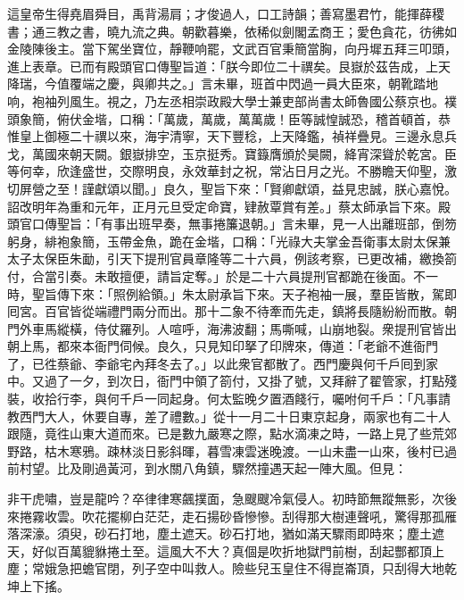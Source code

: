 這皇帝生得堯眉舜目，禹背湯肩；才俊過人，口工詩韻；善寫墨君竹，能揮薛稷書；通三教之書，曉九流之典。朝歡暮樂，依稀似劍閣孟商王；愛色貪花，彷彿如金陵陳後主。{}當下駕坐寶位，靜鞭响罷，文武百官秉簡當胸，向丹墀五拜三叩頭，進上表章。已而有殿頭官口傳聖旨道：「朕今即位二十禩矣。艮嶽於茲告成，上天降瑞，今值覆端之慶，與卿共之。」言未畢，班首中閃過一員大臣來，朝靴踏地响，袍袖列風生。視之，乃左丞相崇政殿大學士兼吏部尚書太師魯國公蔡京也。襆頭象簡，俯伏金堦，口稱：「萬歲，萬歲，萬萬歲！臣等誠惶誠恐，稽首頓首，恭惟皇上御極二十禩以來，海宇清寧，天下豐稔，上天降鑑，禎祥疊見。三邊永息兵戈，萬國來朝天闕。銀嶽排空，玉京挺秀。寶籙膺頒於昊闕，絳宵深聳於乾宮。{}臣等何幸，欣逢盛世，交際明良，永效華封之祝，常沾日月之光。不勝瞻天仰聖，激切屏營之至！謹獻頌以聞。」{}良久，聖旨下來：「賢卿獻頌，益見忠誠，朕心嘉悅。詔改明年為重和元年，正月元旦受定命寶，肄赦覃賞有差。」蔡太師承旨下來。殿頭官口傳聖旨：「有事出班早奏，無事捲簾退朝。」言未畢，見一人出離班部，倒笏躬身，緋袍象簡，玉帶金魚，跪在金堦，口稱：「光祿大夫掌金吾衛事太尉太保兼太子太保臣朱勔，引天下提刑官員章隆等二十六員，例該考察，已更改補，繳換箚付，合當引奏。未敢擅便，請旨定奪。」於是二十六員提刑官都跪在後面。不一時，聖旨傳下來：「照例給領。」朱太尉承旨下來。天子袍袖一展，羣臣皆散，駕即囘宮。百官皆從端禮門兩分而出。那十二象不待牽而先走，鎮將長隨紛紛而散。朝門外車馬縱橫，侍仗羅列。人喧呼，海沸波翻；馬嘶喊，山崩地裂。衆提刑官皆出朝上馬，都來本衙門伺候。良久，只見知印拏了印牌來，傳道：「老爺不進衙門了，已徃蔡爺、李爺宅內拜冬去了。」以此衆官都散了。西門慶與何千戶囘到家中。又過了一夕，到次日，衙門中領了箚付，又掛了號，又拜辭了翟管家，打點殘裝，收拾行李，與何千戶一同起身。何太監晚夕置酒餞行，囑咐何千戶：「凡事請教西門大人，休要自專，差了禮數。」從十一月二十日東京起身，兩家也有二十人跟隨，竟徃山東大道而來。已是數九嚴寒之際，點水滴凍之時，一路上見了些荒郊野路，枯木寒鴉。疎林淡日影斜暉，暮雪凍雲迷晚渡。一山未盡一山來，後村已過前村望。比及剛過黃河，到水關八角鎮，驟然撞遇天起一陣大風。{}但見：

\begin{myquote}
非干虎嘯，豈是龍吟？卒律律寒飆撲面，急颼颼冷氣侵人。初時節無蹤無影，次後來捲霧收雲。吹花擺柳白茫茫，走石揚砂昏慘慘。刮得那大樹連聲吼，驚得那孤雁落深濠。須臾，砂石打地，塵土遮天。砂石打地，猶如滿天驟雨即時來；塵土遮天，好似百萬貔貅捲土至。這風大不大？真個是吹折地獄門前樹，刮起酆都頂上塵；常娥急把蟾官閉，列子空中叫救人。險些兒玉皇住不得崑崙頂，只刮得大地乾坤上下搖。
\end{myquote}

